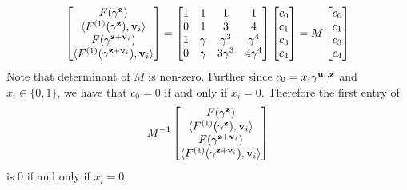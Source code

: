 \[
\left[
\begin{matrix}
    F(\gamma^{\mathbf{z}})\\
    \langle F^{(1)}(\gamma^{\mathbf{z}}), \mathbf{v}_i\rangle\\
    F(\gamma^{\mathbf{z}+\mathbf{v}_i})\\
    \langle F^{(1)}(\gamma^{\mathbf{z}+\mathbf{v}_i}), \mathbf{v}_i\rangle\\
\end{matrix}
\right]=\left[
\begin{matrix}
    1 &1 &1 &1 \\
    0 &1 &3 &4 \\
    1 &\gamma &\gamma^3 &\gamma^4\\
    0 &\gamma &3\gamma^3 &4\gamma^4\\
\end{matrix}\right]\left[
\begin{matrix}
    c_0\\
    c_1\\
    c_3\\
    c_4
\end{matrix}\right]=M\left[
\begin{matrix}
    c_0\\
    c_1\\
    c_3\\
    c_4
\end{matrix}\right]
\]
Note that determinant of $M$ is non-zero. Further since $c_0=x_i\gamma^{\mathbf{u}_i,\mathbf{z}}$ and $x_i\in \{0,1\}$, we have that $c_0=0$ if and only if $x_i=0$. Therefore the first entry of \[M^{-1}\left[\begin{matrix}
    F(\gamma^{\mathbf{z}})\\
    \langle F^{(1)}(\gamma^{\mathbf{z}}), \mathbf{v}_i\rangle\\
    F(\gamma^{\mathbf{z}+\mathbf{v}_i})\\
    \langle F^{(1)}(\gamma^{\mathbf{z}+\mathbf{v}_i}), \mathbf{v}_i\rangle\\
\end{matrix}\right]\]
is $0$ if and only if $x_i=0$\;.
